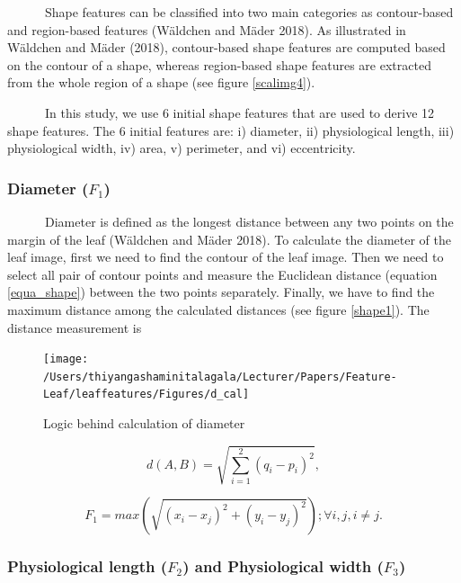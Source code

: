 \documentclass{article}
\begin{document}
~~~~~~Shape features can be classified into two main categories as
contour-based and region-based features (Wäldchen and Mäder 2018). As
illustrated in Wäldchen and Mäder (2018), contour-based shape features
are computed based on the contour of a shape, whereas region-based shape
features are extracted from the whole region of a shape (see figure
\ref{scalimg4}).

~~~~~~In this study, we use 6 initial shape features that are used to
derive 12 shape features. The 6 initial features are: i) diameter, ii)
physiological length, iii) physiological width, iv) area, v) perimeter,
and vi) eccentricity.

\hypertarget{diameter-f_1}{%
\subsubsection{\texorpdfstring{Diameter
(\(F_1\))}{Diameter (F\_1)}}\label{diameter-f_1}}

~~~~~~Diameter is defined as the longest distance between any two points
on the margin of the leaf (Wäldchen and Mäder 2018). To calculate the
diameter of the leaf image, first we need to find the contour of the
leaf image. Then we need to select all pair of contour points and
measure the Euclidean distance (equation \ref{equa_shape}) between the
two points separately. Finally, we have to find the maximum distance
among the calculated distances (see figure \ref{shape1}). The distance
measurement is

\begin{figure}[!ht]

{\centering \texttt{[image: /Users/thiyangashaminitalagala/Lecturer/Papers/Feature-Leaf/leaffeatures/Figures/d\_cal]} 

}

\caption{\label{shape1}Logic behind calculation of diameter}\label{fig:unnamed-chunk-14}
\end{figure}

\begin{equation}
    d\left( A,B\right)   = \sqrt {\sum _{i=1}^{2}  \left( q_{i}-p_{i}\right)^2},
\label{equa_shape}
\end{equation}

\begin{equation}
   F_1 = max(\sqrt{(x_i-x_j)^2 + (y_i-y_j)^2}); \forall i,j, i \neq j.
\label{equa_F1}
\end{equation}

\hypertarget{physiological-length-f_2-and-physiological-width-f_3}{%
\subsubsection{\texorpdfstring{Physiological length (\(F_2\)) and
Physiological width
(\(F_3\))}{Physiological length (F\_2) and Physiological width (F\_3)}}\label{physiological-length-f_2-and-physiological-width-f_3}}
\end{document}
